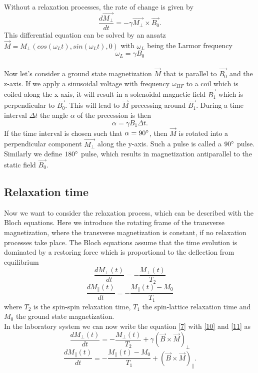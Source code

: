 Without a relaxation processes, the rate of change is given by
\begin{equation}
	\label{7}
	\dfrac{d\vec{M_{\perp}}}{dt} = - \gamma \vec{M_{\perp}} \times \vec{B_{0}}.
\end{equation}
This differential equation can be solved by an ansatz $\vec{M} = M_{\perp}(cos(\omega_{L} t),sin(\omega_{L} t),0)$ with $\omega_{L}$ being the Larmor frequency 
\begin{equation}
	\label{8}
	\omega_{L} = \gamma B_{0}
\end{equation}
\vspace{5mm} \\
Now let's consider a ground state magnetization $\vec{M}$ that is parallel to $\vec{B_0}$ and the z-axis. If we apply a sinusoidal voltage with frequency $\omega_{HF}$ to a coil which is coiled along the x-axis, it will result in a solenoidal magnetic field $\vec{B_1}$ which is perpendicular to $\vec{B_0}$. This will lead to $\vec{M}$ precessing around $\vec{B_1}$. During a time interval $\Delta t$ the angle $\alpha$ of the precession is then 
\begin{equation}
	\label{9}
	\alpha = \gamma B_{1} \Delta t.
\end{equation}
If the time interval is chosen such that $\alpha = 90 \degree$, then $\vec{M}$ is rotated into a perpendicular component $\vec{M_{\perp}}$ along the y-axis. Such a pulse is called a $90 \degree$ pulse. Similarly we define $180 \degree$ pulse, which results in magnetization antiparallel to the static field $\vec{B_{0}}$.
\subsection{Relaxation time}\label{relax}
Now we want to consider the relaxation process, which can be described with the Bloch equations. Here we introduce the rotating frame of the transverse magnetization, where the transverse magnetization is constant, if no relaxation processes take place. The Bloch equations assume that the time evolution is dominated by a restoring force which is proportional to the deflection from equilibrium
\begin{equation}
	\label{10}
	\dfrac{dM_{\perp}(t)}{dt} = - \dfrac{M_{\perp}(t)}{T_{2}}
\end{equation}
\begin{equation}
	\label{11}
	\dfrac{dM_{\parallel}(t)}{dt} = - \dfrac{M_{\parallel}(t)-M_{0}}{T_{1}}
\end{equation}
where $T_{2}$ is the spin-spin relaxation time, $T_{1}$ the spin-lattice relaxation time and $M_{0}$ the ground state magnetization.
\vspace{3mm}\\
In the laboratory system we can now write the equation \eqref{7} with \eqref{10} and \eqref{11} as
\begin{equation}
	\label{12}
	\dfrac{dM_{\perp}(t)}{dt} = - \dfrac{M_{\perp}(t)}{T_{2}} + \gamma ( \vec{B} \times \vec{M})_{\perp}
\end{equation}
\begin{equation}
	\label{13}
	\dfrac{dM_{\parallel}(t)}{dt} = - \dfrac{M_{\parallel}(t)-M_{0}}{T_{1}} + ( \vec{B} \times \vec{M})_{\parallel}.
\end{equation}
